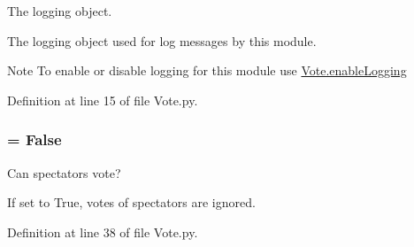 The logging object. 

The logging object used for log messages by this module. \begin{DoxyNote}{Note}
To enable or disable logging for this module use \hyperlink{namespace_vote_acfb2109b9dab2995578ab19517868aa3}{Vote.enableLogging} 
\end{DoxyNote}


Definition at line 15 of file Vote.py.

\hypertarget{namespace_vote_ae0bddda424d524ab6f934decff807faa}{
\subsubsection[{spec\_\-allowed}]{ = False}}
\label{namespace_vote_ae0bddda424d524ab6f934decff807faa}


Can spectators vote? 

If set to True, votes of spectators are ignored. 

Definition at line 38 of file Vote.py.


